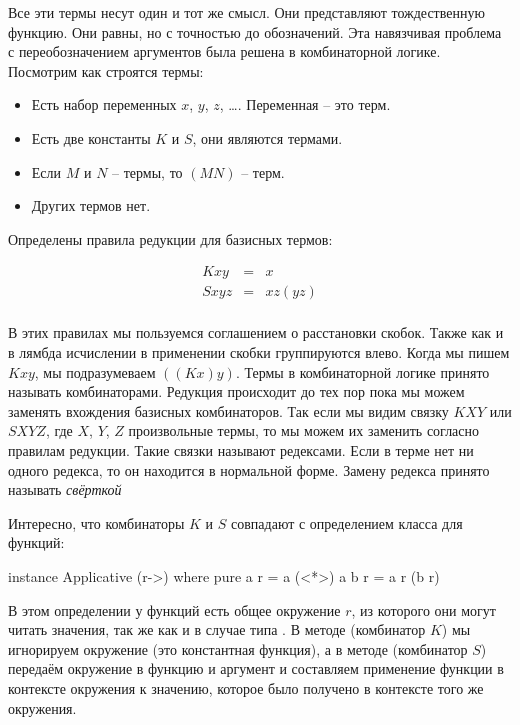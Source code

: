Все эти термы несут один и тот же смысл. Они представляют тождественную
функцию. Они равны, но с точностью до обозначений. Эта навязчивая
проблема с переобозначением аргументов была решена в комбинаторной
логике. Посмотрим как строятся термы:

\begin{itemize}
\item
  Есть набор переменных $x$, $y$, $z$, \ldots{}. Переменная -- это терм.
\item
  Есть две константы $K$ и $S$, они являются термами.
\item
  Если $M$ и $N$ -- термы, то $(MN)$ -- терм.
\item
  Других термов нет.
\end{itemize}

Определены правила редукции для базисных термов:

\begin{eqnarray*}
Kxy  &=& x \\
Sxyz &=& xz(yz) \\
\end{eqnarray*}

В этих правилах мы пользуемся соглашением о расстановки скобок. Также
как и в лямбда исчислении в применении скобки группируются влево. Когда
мы пишем $Kxy$, мы подразумеваем $((Kx)y)$. Термы в комбинаторной логике
принято называть комбинаторами. Редукция происходит до тех пор пока мы
можем заменять вхождения базисных комбинаторов. Так если мы видим связку
$KXY$ или $SXYZ$, где $X$, $Y$, $Z$ произвольные термы, то мы можем их
заменить согласно правилам редукции. Такие связки называют редексами.
Если в терме нет ни одного редекса, то он находится в нормальной форме.
Замену редекса принято называть \emph{свёрткой}

Интересно, что комбинаторы $K$ и $S$ совпадают с определением класса
 для функций:


\begin{code}
instance Applicative (r->) where
    pure a r = a
    (<*>) a b r = a r (b r)
\end{code}

В этом определении у функций есть общее окружение $r$, из которого они
могут читать значения, так же как и в случае типа . В методе
 (комбинатор $K$) мы игнорируем окружение (это константная
функция), а в методе \In{<*>} (комбинатор $S$) передаём окружение в
функцию и аргумент и составляем применение функции в контексте окружения
 к значению, которое было получено в контексте того же окружения.

